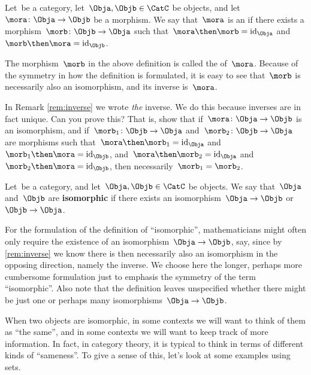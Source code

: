\begin{ctdefinition}[Isomorphism]
    Let~\CatC be a category, let~$\Obja,\Objb \in \CatC$ be objects, and let~$\mora \colon \Obja \to \Objb$ be a morphism. We say that~$\mora$ is an \emph{} if there exists a morphism~$\morb\colon \Objb \to \Obja$ such that~$\mora \then \morb = \text{id}_\Obja$ and~$\morb \then \mora = \text{id}_\Objb$.
\end{ctdefinition}

\begin{remark}
    \label{rem:inverse}
    The morphism~$\morb$ in the above definition is called the \textbf{} of~$\mora$. Because of the symmetry in how the definition is formulated, it is easy to see that~$\morb$ is necessarily also an isomorphism, and its inverse is~$\mora$.
\end{remark}

\begin{exercise}
    In Remark \cref{rem:inverse} we wrote \emph{the} inverse. We do this because inverses are in fact unique. Can you prove this?
    That is, show that if~$\mora \colon \Obja \to \Objb$ is an isomorphism, and if~$\morb_1\colon \Objb \to \Obja$ and~$\morb_2\colon \Objb \to \Obja$ are morphisms such that~$\mora \then \morb_1 = \text{id}_\Obja$ and~$\morb_1 \then \mora = \text{id}_\Objb$, and~$\mora \then \morb_2 = \text{id}_\Obja$ and~$\morb_2 \then \mora = \text{id}_\Objb$, then necessarily~$\morb_1 = \morb_2$.
\end{exercise}

\begin{ctdefinition}[Isomorphic]
    Let~\CatC be a category, and let~$\Obja,\Objb \in \CatC$ be objects. We say that~$\Obja$ and~$\Objb$ are \textbf{isomorphic} if there exists an isomorphism~$\Obja \to \Objb$ or~$\Objb \to \Obja$.
\end{ctdefinition}

For the formulation of the definition of ``isomorphic'', mathematicians might often only require the existence of an isomorphism~$\Obja \to \Objb$, say, since by \cref{rem:inverse} we know there is then necessarily also an isomorphism in the opposing direction, namely the inverse. We choose here the longer, perhaps more cumbersome formulation just to emphasis the symmetry of the term ``isomorphic''. Also note that the definition leaves unspecified whether there might be just one or perhaps many isomorphisms~$\Obja \to \Objb$.

When two objects are isomorphic, in some contexts we will want to think of them as ``the same'', and in some contexts we will want to keep track of more information. In fact, in category theory, it is typical to think in terms of different kinds of ``sameness''. To give a sense of this, let's look at some examples using sets.

